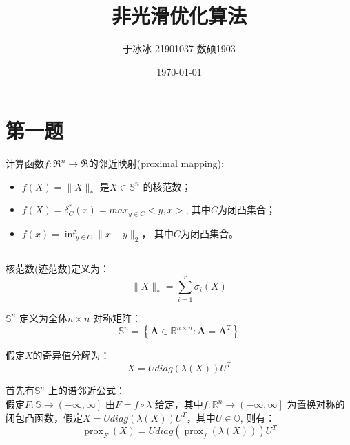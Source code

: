 \documentclass[fontset=mac]{ctexart}
\title{非光滑优化算法}
\author{于冰冰 21901037 数硕1903}
\date{\today}
\begin{document}
	\maketitle
	\tableofcontents
	\newpage 
	\section{第一题}
	计算函数$f:\mathfrak{R}^n \to \bar{\mathfrak{R}}$的邻近映射(proximal mapping):
	\begin{itemize}
		\item $f(X)=\|X\|_*$ 是$X \in \mathbb{S}^n$ 的核范数；
		\item $f(X) = \delta_C^*(x) = max_{y \in C}<y,x>$, 其中$C$为闭凸集合；
		\item $f(x)=\inf _{y \in C}\|x-y\|_{2}$， 其中$C$为闭凸集合。
	\end{itemize}
	
	\subsection{}
	核范数(迹范数)定义为：
	\begin{equation}
		\|X\|_* = \sum_{i=1}^{r} \sigma_i(X)
	\end{equation}
	
	$\mathbb{S}^n$ 定义为全体$n \times n$ 对称矩阵：
	\begin{equation}
	\mathbb{S}^{n}=\left\{\mathbf{A} \in \mathbb{R}^{n \times n}: \mathbf{A}=\mathbf{A}^{T}\right\}
	\end{equation}
	
	假定$X$的奇异值分解为：
	$$
	X = Udiag(\lambda (X))U^T
	$$
	
	首先有$\mathbb{S}^n$ 上的谱邻近公式：\\
	假定$F:\mathbb{S} \to \left. \left(-\infty,\infty \right. \right]$ 由$F = f \circ \lambda$ 给定，其中$f: \mathbb{R}^n \to \left. \left( -\infty, \infty \right. \right]$ 为置换对称的闭包凸函数，假定$X = Udiag(\lambda (X))U^T$，其中$U \in \mathbb{O}$, 则有：
	\begin{equation}
	\operatorname{prox}_{F}(X)={Udiag}\left(\operatorname{prox}_{f}({\lambda}({X}))\right) {U}^{T}
	\end{equation}
	
\end{document}
